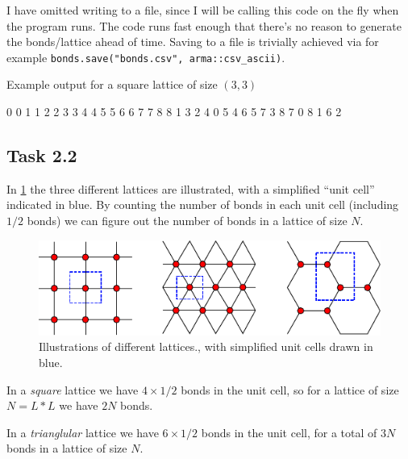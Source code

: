 \documentclass[a4paper]{article}
\newcommand{\cpp}{\texttt{C++}}
\begin{document}
\begin{listing}[h!]
%
\caption{%
    A \cpp\ code snippet for generating the bonds in a rectangular lattice, using periodic boundary conditions.%
    \label{lst:makebonds}%
}
\end{listing}
\FloatBarrier

I have omitted writing to a file, since I will be calling this code on the fly when the program runs. The code runs fast enough that there's no reason to generate the bonds/lattice ahead of time. Saving to a file is trivially achieved via for example
\texttt{bonds.save("bonds.csv", arma::csv_ascii)}.

Example output for a square lattice of size $(3, 3)$
\begin{cppcode}
0  0  1  1  2  2  3  3  4  4  5  5  6  6  7  7  8  8
1  3  2  4  0  5  4  6  5  7  3  8  7  0  8  1  6  2
\end{cppcode}

\subsection*{Task 2.2}

In \cref{fig:lattices} the three different lattices are illustrated, with a simplified ``unit cell'' indicated in blue. By counting the number of bonds in each unit cell (including $1/2$ bonds) we can figure out the number of bonds in a lattice of size $N$.
\begin{figure}[htb!]
    \centering
    \includegraphics{lattice.pdf}
    \caption{Illustrations of different lattices.\label{fig:lattices}, with simplified unit cells drawn in blue.}
\end{figure}

In a \emph{square} lattice we have $4\times 1/2$ bonds in the unit cell, so for a lattice of size $N = L*L$ we have $2N$ bonds.

In a \emph{trianglular} lattice we have $6\times 1/2$ bonds in the unit cell, for a total of $3N$ bonds in a lattice of size $N$.
\end{document}
